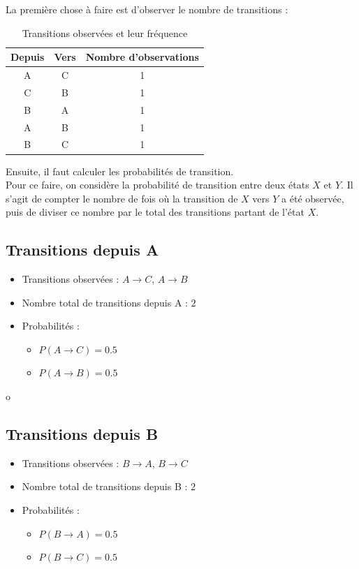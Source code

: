 \documentclass[a4paper, 11pt]{report}
\begin{document}
\noindent{}La première chose à faire est d'observer le nombre de transitions :
\begin{table}[h!]
	\centering
	\begin{tabular}{|c|c|c|}
		\hline
		\textbf{Depuis} & \textbf{Vers} & \textbf{Nombre d'observations} \\
		\hline
		A               & C             & 1                              \\
		C               & B             & 1                              \\
		B               & A             & 1                              \\
		A               & B             & 1                              \\
		B               & C             & 1                              \\
		\hline
	\end{tabular}
	\caption{Transitions observées et leur fréquence}
\end{table}

Ensuite, il faut calculer les probabilités de transition. \\
Pour ce faire, on considère la probabilité de transition entre deux états \(X\) et \(Y\). Il s'agit de compter le nombre de fois où la transition de \(X\) vers \(Y\) a été observée, puis de diviser ce nombre par le total des transitions partant de l'état \(X\).

\subsection*{Transitions depuis A}
\begin{itemize}
	\item Transitions observées : \( A \rightarrow C \), \( A \rightarrow B \)
	\item Nombre total de transitions depuis A : \(2\)
	\item Probabilités :
	      \begin{itemize}
		      \item \( P(A \rightarrow C)  = 0.5 \)
		      \item \( P(A \rightarrow B)  = 0.5 \)
	      \end{itemize}
\end{itemize}o

\subsection*{Transitions depuis B}
\begin{itemize}
	\item Transitions observées : \( B \rightarrow A \), \( B \rightarrow C \)
	\item Nombre total de transitions depuis B : \(2\)
	\item Probabilités :
	      \begin{itemize}
		      \item \( P(B \rightarrow A) = 0.5 \)
		      \item \( P(B \rightarrow C) = 0.5 \)
	      \end{itemize}
\end{itemize}
\end{document}
